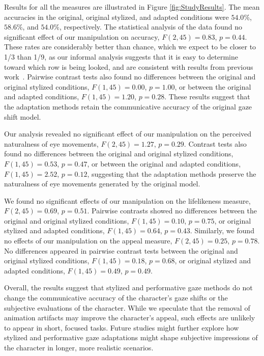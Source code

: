 Results for all the measures are illustrated in Figure \ref{fig:StudyResults}. The mean accuracies in the original, original stylized, and adapted conditions were $54.0\%$, $58.6\%$, and $54.0\%$, respectively. The statistical analysis of the data found no significant effect of our manipulation on accuracy, $F(2,45) = 0.83$, $p = 0.44$. These rates are considerably better than chance, which we expect to be closer to 1/3 than 1/9, as our informal analysis suggests that it is easy to determine toward which row is being looked, and are consistent with results from previous work~\cite{argyle1976gaze,goldberg1969distance,andrist2012designing}. Pairwise contrast tests also found no differences between the original and original stylized conditions, $F(1,45) = 0.00$, $p = 1.00$, or between the original and adapted conditions, $F(1,45) = 1.20$, $p = 0.28$. These results suggest that the adaptation methods retain the communicative accuracy of the original gaze shift model.

Our analysis revealed no significant effect of our manipulation on the perceived naturalness of eye movements, $F(2,45) = 1.27$, $p = 0.29$. Contrast tests also found no differences between the original and original stylized conditions, $F(1,45) = 0.53$, $p = 0.47$, or between the original and adapted conditions, $F(1,45) = 2.52$, $p = 0.12$, suggesting that the adaptation methods preserve the naturalness of eye movements generated by the original model.

We found no significant effects of our manipulation on the lifelikeness measure, $F(2,45) = 0.69$, $p = 0.51$. Pairwise contrasts showed no differences between the original and original stylized conditions, $F(1,45) = 0.10$, $p = 0.75$, or original stylized and adapted conditions, $F(1,45) = 0.64$, $p = 0.43$. Similarly, we found no effects of our manipulation on the appeal measure, $F(2,45) = 0.25$, $p = 0.78$. No differences appeared in pairwise contrast tests between the original and original stylized conditions, $F(1,45) = 0.18$, $p = 0.68$, or original stylized and adapted conditions, $F(1,45) = 0.49$, $p = 0.49$.

Overall, the results suggest that stylized and performative gaze methods do not change the communicative accuracy of the character's gaze shifts or the subjective evaluations of the character. While we speculate that the removal of animation artifacts may improve the character's appeal, such effects are unlikely to appear in short, focused tasks. Future studies might further explore how stylized and performative gaze adaptations might shape subjective impressions of the character in longer, more realistic scenarios.